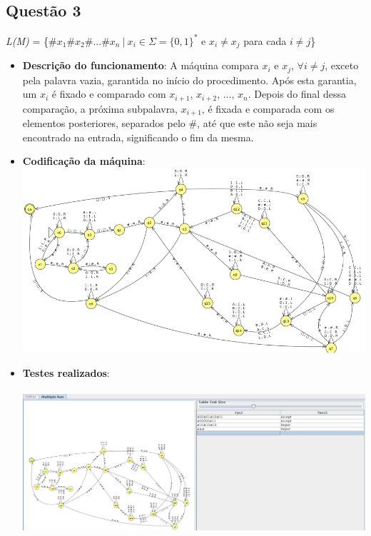 \documentclass{article}
\begin{document}
\subsection*{Questão 3}
\textit{L(M)} = \{$\#x_{1}\#x_{2}\#...\#x_{n}\  \vert\  x_{i} \in \Sigma = \{0,1\}^{*}$ e $x_{i} \neq x_{j}$ para cada $i \neq j$\}
\begin{itemize}
    \item \textbf{Descrição do funcionamento}: A máquina compara $x_i$ e $x_j$, $\forall i\neq j$, exceto pela palavra vazia, garantida no início do procedimento. Após esta garantia, um $x_i$ é fixado e comparado com $x_{i+1}$, $x_{i+2}$, ..., $x_n$. Depois do final dessa comparação, a próxima subpalavra, $x_{i+1}$, é fixada e comparada com os elementos posteriores, separados pelo \#, até que este não seja mais encontrado na entrada, significando o fim da mesma.
    \item \textbf{Codificação da máquina}: \\
    \includegraphics[width=\textwidth]{questao3_ss.png}
    \item \textbf{Testes realizados}: \\ \\
    \includegraphics[width=\textwidth]{questao3_inputs.png}
\end{itemize}
\end{document}
